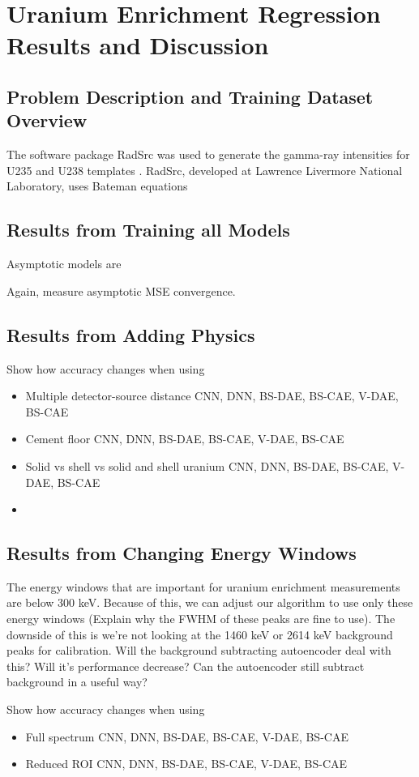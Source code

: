 \chapter{Uranium Enrichment Regression Results and Discussion}

\section{Problem Description and Training Dataset Overview}

The software package RadSrc was used to generate the gamma-ray intensities for U235 and U238 templates \cite{Hiller2007}. RadSrc, developed at Lawrence Livermore National Laboratory, uses Bateman equations 

\section{Results from Training all Models}


Asymptotic models are 


Again, measure asymptotic MSE convergence.



\section{Results from Adding Physics}

Show how accuracy changes when using
\begin{itemize}
    \item Multiple detector-source distance
    \subitem CNN, DNN, BS-DAE, BS-CAE, V-DAE, BS-CAE
    \item Cement floor
    \subitem CNN, DNN, BS-DAE, BS-CAE, V-DAE, BS-CAE
    \item Solid vs shell vs solid and shell uranium
    \subitem CNN, DNN, BS-DAE, BS-CAE, V-DAE, BS-CAE
    \item 
\end{itemize}

\section{Results from Changing Energy Windows}

The energy windows that are important for uranium enrichment measurements are below 300 keV. Because of this, we can adjust our algorithm to use only these energy windows (Explain why the FWHM of these peaks are fine to use). The downside of this is we're not looking at the 1460 keV or 2614 keV background peaks for calibration. Will the background subtracting autoencoder deal with this? Will it's performance decrease? Can the autoencoder still subtract background in a useful way?

Show how accuracy changes when using
\begin{itemize}
    \item Full spectrum
    \subitem CNN, DNN, BS-DAE, BS-CAE, V-DAE, BS-CAE
    \item Reduced ROI
    \subitem CNN, DNN, BS-DAE, BS-CAE, V-DAE, BS-CAE
\end{itemize}






